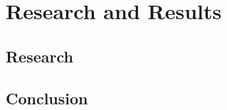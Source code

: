 \documentclass[12pt]{report}
\begin{document}
\part{Research and Results}\label{part-conclusion}

\chapter{Research}\label{c:researsh}

\chapter{Conclusion}\label{c:conclusion}



\clearpage
{}
% 





%








{}
\small
\footnotesize
{}
\setlength{\parskip}{0.3em}

\end{document}
